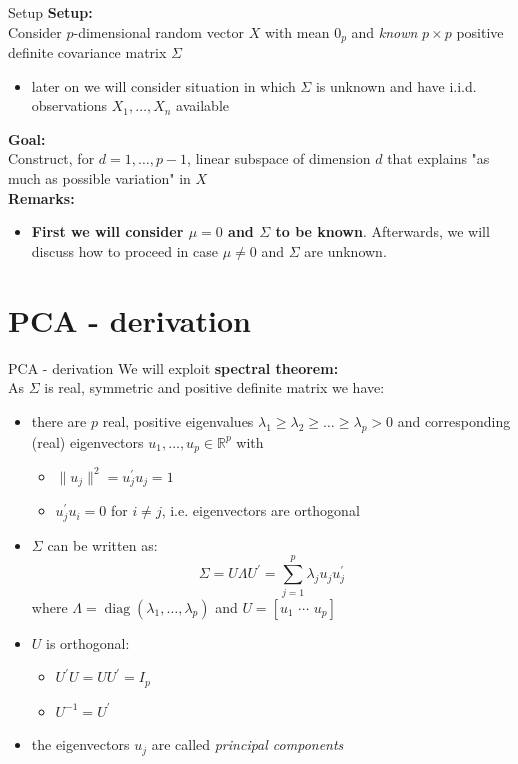 \documentclass[pdf, handout]{beamer}
\begin{document}
\begin{frame}{Setup}
\textbf{Setup:} \\
Consider $p$-dimensional random vector $X$ with mean $0_p$ and \emph{known} $p\times p$ positive definite covariance matrix 
$\Sigma$
\begin{itemize}
\item later on we will consider situation in which $\Sigma$ is unknown and have i.i.d. observations $X_1,\dots,X_n$ available
\end{itemize}
\vspace{.5cm}
\textbf{Goal:} \\
Construct, for $d=1,\dots,p-1$, linear subspace of dimension $d$ that explains "as much as possible variation" in $X$ 
\\
\vspace{.5cm}
\textbf{Remarks:} 
\begin{itemize}
\item \textbf{First we will consider $\mu=0$ and $\Sigma$ to be known}. Afterwards, we will
discuss how to proceed in case $\mu\neq 0$ and $\Sigma$ are unknown.
\end{itemize}
\end{frame}

\section{PCA - derivation}


\begin{frame}{PCA - derivation}
We will exploit \textbf{spectral theorem:} \\
As $\Sigma$ is real, symmetric and positive definite matrix we have:
\begin{itemize}
\item there are $p$ real, positive eigenvalues  $\lambda_1\geq \lambda_2 \geq \dots\geq \lambda_p> 0$ and corresponding (real) eigenvectors 
$u_1,\dots, u_p\in\mathbb{R}^p$ with
\begin{itemize}
\item $\|u_j\|^2 = u_j^\prime u_j =1$
\item $u_j^\prime u_i =0$ for $i\neq j$, i.e. eigenvectors are orthogonal
\end{itemize}  
\item $\Sigma$ can be written as:
\[
\Sigma = U \Lambda U^\prime = \sum_{j=1}^p \lambda_j u_j u_j^\prime
\]
where $\Lambda =\operatorname{diag}(\lambda_1,\dots,\lambda_p)$ and
$U=[ u_1 \,\, \cdots \,\, u_p]$
\item $U$ is orthogonal: 
\begin{itemize}
\item $U^\prime U=U U^\prime = I_p$ 
\item $U^{-1}=U^\prime$
\end{itemize}
\item the eigenvectors $u_j$ are called \emph{principal components}
\end{itemize}
\end{frame}
\end{document}
